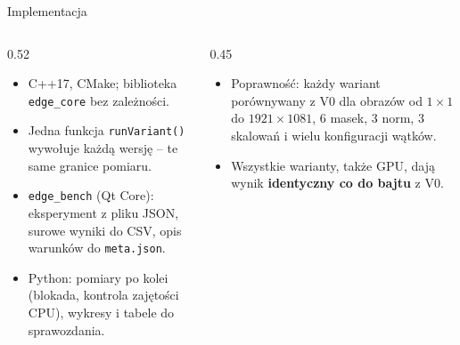 \documentclass[aspectratio=169,11pt]{beamer}
\newcommand{\kod}[1]{\texttt{#1}}
\begin{document}
\begin{frame}{Implementacja}
	\begin{columns}[T]
		\begin{column}{0.52\textwidth}
			\begin{itemize}
				\item C++17, CMake; biblioteka \kod{edge\_core} bez zależności.
				\item Jedna funkcja \kod{runVariant()} wywołuje każdą wersję -- te same granice pomiaru.
				\item \kod{edge\_bench} (Qt Core): eksperyment z pliku JSON, surowe wyniki do CSV, opis warunków do \kod{meta.json}.
				\item Python: pomiary po kolei (blokada, kontrola zajętości CPU), wykresy i tabele do sprawozdania.
			\end{itemize}
		\end{column}
		\begin{column}{0.45\textwidth}
			\begin{itemize}
				\item Poprawność: każdy wariant porównywany z V0 dla obrazów od $1 \times 1$ do $1921 \times 1081$, 6 masek, 3 norm, 3 skalowań i wielu konfiguracji wątków.
				\item Wszystkie warianty, także GPU, dają wynik \textbf{identyczny co do bajtu} z V0.
			\end{itemize}
		\end{column}
	\end{columns}
\end{frame}
\end{document}
